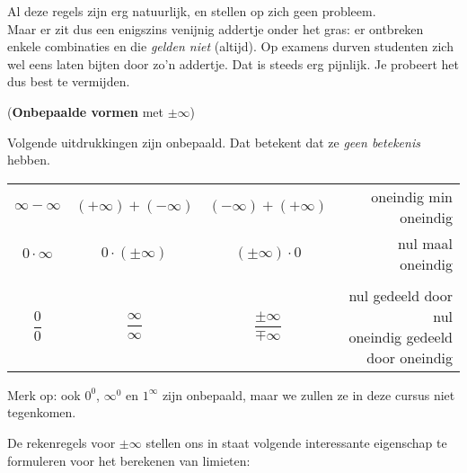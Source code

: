 \documentclass[numbers]{ximera}
\begin{document}
Al deze regels zijn erg natuurlijk, en stellen op zich geen probleem. \\
Maar er zit dus een enigszins venijnig addertje onder het gras: er ontbreken enkele combinaties en die \textit{gelden niet} (altijd). Op examens durven studenten zich wel eens laten bijten door zo'n addertje. Dat is steeds erg pijnlijk. Je probeert het dus best te vermijden.

\begin{proposition} (\textbf{Onbepaalde vormen} met $\pm\infty$)
	
	Volgende uitdrukkingen zijn onbepaald. Dat betekent dat ze \textit{geen betekenis} hebben.	
	
	\begin{tabular}{cccr}
		$\infty - \infty$ &$(+\infty) + (-\infty)$  & 	$(-\infty) + (+\infty) $  & oneindig min oneindig \\
		$0\cdot\infty$ & $0 \cdot (\pm\infty)$   & 	$(\pm\infty)\cdot 0$   & nul maal oneindig \\
		\\
		$\dfrac 00$ & $\dfrac\infty\infty$ & $\dfrac{\pm\infty}{\mp\infty}$ & \shortstack{\hfill nul gedeeld door nul \\ oneindig gedeeld door oneindig}
	\end{tabular}
\end{proposition}
Merk op: ook $0^0$, $\infty^0$ en $1^\infty$ zijn onbepaald, maar we zullen ze in deze cursus niet tegenkomen.


De rekenregels voor $\pm\infty$ stellen ons in staat volgende interessante eigenschap te formuleren voor het berekenen van limieten:
\end{document}
